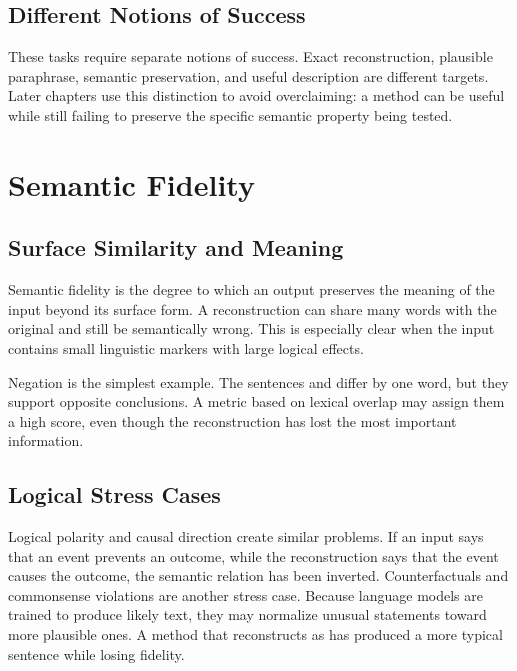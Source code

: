 \documentclass[12pt,a4paper,twoside,openright]{book}
\begin{document}
\subsection{Different Notions of Success}

These tasks require separate notions of success. Exact reconstruction,
plausible paraphrase, semantic preservation, and useful description are
different targets. Later chapters use this distinction to avoid
overclaiming: a method can be useful while still failing to preserve the
specific semantic property being tested.

\section{Semantic Fidelity}

\subsection{Surface Similarity and Meaning}

Semantic fidelity is the degree to which an output preserves the meaning of the
input beyond its surface form. A reconstruction can share many words with the
original and still be semantically wrong. This is especially clear when the
input contains small linguistic markers with large logical effects.

Negation is the simplest example. The sentences  and  differ
by one word, but they support opposite conclusions. A metric based on lexical
overlap may assign them a high score, even though the reconstruction has lost
the most important information.

\subsection{Logical Stress Cases}

Logical polarity and causal direction create similar problems. If an input says
that an event prevents an outcome, while the reconstruction says that the event
causes the outcome, the semantic relation has been inverted. Counterfactuals and
commonsense violations are another stress case. Because language models are
trained to produce likely text, they may normalize unusual statements toward
more plausible ones. A method that reconstructs  as 
has produced a more typical sentence while losing fidelity.
\end{document}
